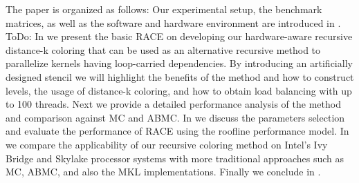 The paper is organized as follows: Our experimental setup, the benchmark matrices, as well as the software and hardware environment are introduced in .
{\GW ToDo:
In  we present the basic RACE on developing our hardware-aware recursive distance-k coloring that can be used as an alternative recursive method to parallelize kernels having loop-carried dependencies. By introducing an artificially designed stencil we will highlight the benefits of the method and how to construct levels, the usage of distance-k coloring, and how to obtain load balancing with up to 100 threads. Next we provide a detailed performance analysis of the method and comparison against \acrshort{MC} and \acrshort{ABMC}. In  we discuss the parameters selection and evaluate the performance of \acrshort{RACE} using the roofline performance model. In  we compare the applicability of our recursive coloring method on Intel's Ivy Bridge and Skylake processor systems with more traditional approaches such as  \acrshort{MC}, \acrshort{ABMC}, and also the \acrshort{MKL} implementations. Finally we conclude in 
.}


	
\begin{comment}
 \acrshort{RACE}  has two main usage scenarios: It can either return all relevant data structures and parallelization information required for manual implementation of the kernel at hand, or one can just use its callback function interface, which takes care of parallelization and all data handling automatically. As of now \acrshort{RACE} is limited to shared memory nodes as it only supports thread-level parallelism.\acrshort{RACE} uses the \acrfull{CRS} sparse matrix data format but can be easily extended to other formats.
\end{comment}



